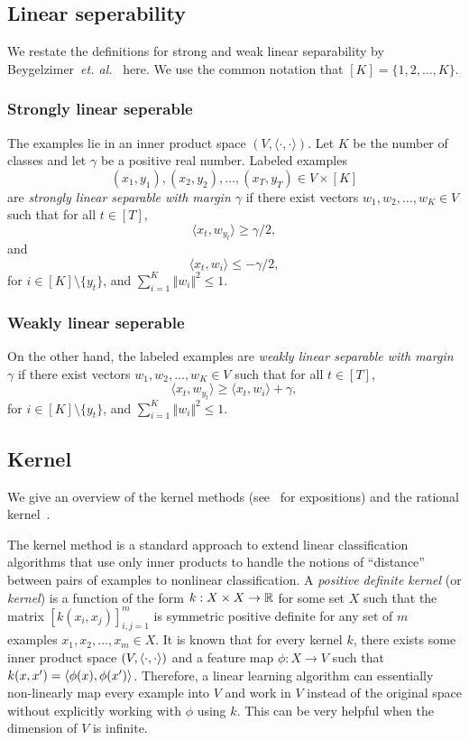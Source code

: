 \subsection{Linear seperability}
We restate the definitions for strong and weak linear separability by Beygelzimer~{\em et. al.}~\cite{BeygelzimerPSTWZ2019-separable} here.  
We use the common notation that $[K]=\{1,2,\ldots,K\}$.

\subsubsection{Strongly linear seperable}
The examples lie in an inner product space $(V,\langle\cdot,\cdot\rangle)$.  Let $K$ be the number of classes and let $\gamma$ be a positive real number.
Labeled examples
\[
(x_1,y_1),(x_2,y_2),\ldots,(x_T,y_T)\in V\times[K]
\]
are {\em strongly linear separable with margin $\gamma$} if there exist vectors $w_1,w_2,\ldots,w_K\in V$ such that
for all $t\in[T]$,
\[
\langle x_t, w_{y_t}\rangle \geq \gamma/2,
\]
and
\[
\langle x_t, w_i\rangle \leq -\gamma/2,
\]
for $i\in [K]\setminus \{y_t\}$,
and $\sum_{i=1}^K \Vert w_i \Vert^2\leq 1$.
\subsubsection{Weakly linear seperable}
On the other hand, the labeled examples are {\em weakly linear separable with margin $\gamma$} if there exist vectors $w_1,w_2,\ldots,w_K\in V$ such that
for all $t\in[T]$,
\[
\langle x_t, w_{y_t}\rangle \geq \langle x_t, w_i\rangle + \gamma,
\]
for $i\in [K]\setminus \{y_t\}$, and $\sum_{i=1}^K \Vert w_i \Vert^2\leq 1$.

\subsection{Kernel}
We give an overview of the kernel methods (see~\cite{ShaweTaylorC2004-kernel-methods} for expositions) and the rational kernel~\cite{ShalevShwartzSS2011-kernel-based}.

The kernel method is a standard approach to extend linear classification algorithms that use only inner products to handle the notions of ``distance'' between pairs of examples to nonlinear classification.
A {\em positive definite kernel} (or {\em kernel}) is a function of the form $k: X\times X\rightarrow {\mathbb{R}}$ for some set $X$ such that the matrix $[k(x_i,x_j)]_{i,j=1}^m$ is symmetric positive definite for any set of $m$ examples $x_1,x_2,\ldots,x_m\in X$.  It is known that for every kernel $k$, there exists some inner product space $(V,\langle \cdot,\cdot\rangle)$ and a feature map $\phi:X\rightarrow V$ such that $k(x,x')=\langle \phi(x),\phi(x')\rangle$.  Therefore, a linear learning algorithm can essentially non-linearly map every example into $V$ and work in $V$ instead of the original space without explicitly working with $\phi$ using $k$.  This can be very helpful when the dimension of $V$ is infinite.

